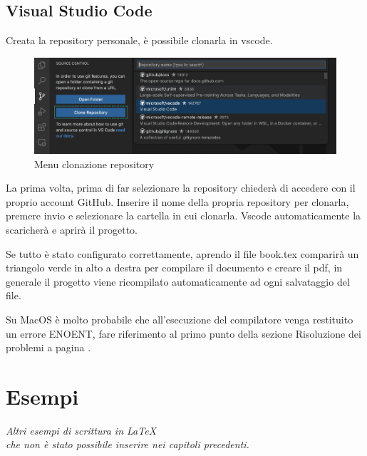 \documentclass[envcountsame,envcountchap]{svmono}
\begin{document}
\section{Visual Studio Code}
Creata la repository personale, è possibile clonarla in vscode. \citep{vscodeGit}
\begin{figure}[H]
    \centering
    \includegraphics[width=\linewidth]{images/vscode/vscode_clone_repo.png}
    \caption{Menu clonazione repository}
    \label{clonazione_repository}
\end{figure}
La prima volta, prima di far selezionare la repository chiederà di accedere con il 
proprio account GitHub. Inserire il nome della propria repository per clonarla, 
premere invio e selezionare la cartella in cui clonarla.
Vscode automaticamente la scaricherà e aprirà il progetto.

Se tutto è stato configurato correttamente, aprendo il file book.tex comparirà un 
triangolo verde in alto a destra per compilare il documento e creare il pdf, in generale 
il progetto viene ricompilato automaticamente ad ogni salvataggio del file.

Su MacOS è molto probabile che all'esecuzione del compilatore venga restituito un 
errore ENOENT, fare riferimento al primo punto della sezione Risoluzione dei problemi
a pagina \pageref{enoent}.



\chapter{Esempi}  \label{Cap.3}

\vspace{2cm}

\begin{flushright}
 \textit{Altri esempi di scrittura in \LaTeX\\ che non è stato possibile inserire nei capitoli precedenti.}
\end{flushright}

\vspace{0.5cm}
\end{document}
